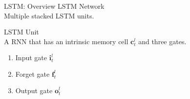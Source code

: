 \documentclass{beamer}
\newcommand{\ii}{\pmb{i}}
\newcommand{\oo}{\pmb{o}}
\newcommand{\ff}{\pmb{f}}
\newcommand{\Cc}{\pmb{c}}
\begin{document}
\begin{frame}{LSTM: Overview}
	\alert{LSTM Network}\\
	Multiple stacked LSTM units.
	
	\alert{LSTM Unit}\\
	A RNN that has an intrinsic memory \alert{cell} $\Cc_t^l$ and three \alert{gates}.

	\pause
	\begin{enumerate}
	\item \alert{Input gate} $\ii_t^l$ %
	\item \alert{Forget gate} $\ff_t^l$ %
	\item \alert{Output gate} $\oo_t^l$ %
	\end{enumerate}
	
\end{frame}
\end{document}
